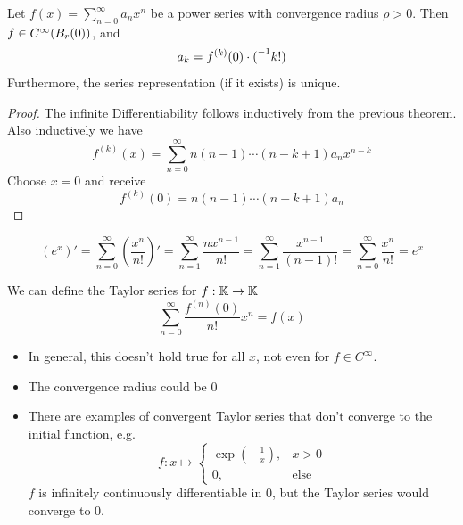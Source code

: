\documentclass[../../script.tex]{subfiles}
\begin{document}
\begin{cor}
    Let $f(x) = \sum_{n=0}^{\infty} a_n x^n$ be a power series with convergence radius $\rho > 0$. Then $f \in C^{\infty}(\oball[r](0))$, and 
    \[
        a_k = f^{(k)}(0) \cdot \inv(k!)
    \]
    Furthermore, the series representation (if it exists) is unique.
\end{cor}
\begin{proof}
    The infinite Differentiability follows inductively from the previous theorem. Also inductively we have 
    \begin{equation}
        f^{(k)}(x) = \sum_{n=0}^{\infty} n(n-1) \cdots (n - k + 1) a_nx^{n-k}
    \end{equation}
    Choose $x = 0$ and receive 
    \begin{equation}
        f^{(k)}(0) = n (n-1) \cdots (n - k + 1) a_n
    \end{equation}
\end{proof}

\begin{eg}
    \[
        (e^x)' = \sum_{n=0}^{\infty} \left(\frac{x^n}{n!}\right)' = \sum_{n=1}^{\infty} \frac{n x^{n-1}}{n!} = \sum_{n=1}^{\infty} \frac{x^{n-1}}{(n-1)!} = \sum_{n=0}^{\infty} \frac{x^n}{n!} = e^x
    \]
\end{eg}

\begin{rem}
    We can define the Taylor series for $f: \field \rightarrow \field$
    \[
        \sum_{n=0}^{\infty} \frac{f^(n)(0)}{n!} x^n = f(x)
    \]
    \begin{itemize}
        \item In general, this doesn't hold true for all $x$, not even for $f \in C^{\infty}$.
        \item The convergence radius could be $0$
        \item There are examples of convergent Taylor series that don't converge to the initial function, e.g.
        \[
            f: x \mapsto \begin{cases}
                \exp\left(-\frac{1}{x}\right), & x > 0 \\
                0, & \text{else}
            \end{cases}
        \]
        $f$ is infinitely continuously differentiable in $0$, but the Taylor series would converge to $0$.
    \end{itemize}
\end{rem}
\end{document}
